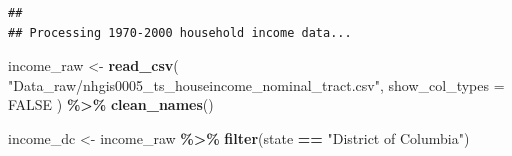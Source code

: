 \documentclass[
]{article}
\newenvironment{Shaded}{\begin{snugshade}}{\end{snugshade}}
\newcommand{\AttributeTok}[1]{\textcolor[rgb]{0.13,0.29,0.53}{#1}}
\newcommand{\ConstantTok}[1]{\textcolor[rgb]{0.56,0.35,0.01}{#1}}
\newcommand{\FunctionTok}[1]{\textcolor[rgb]{0.13,0.29,0.53}{\textbf{#1}}}
\newcommand{\NormalTok}[1]{#1}
\newcommand{\OtherTok}[1]{\textcolor[rgb]{0.56,0.35,0.01}{#1}}
\newcommand{\SpecialCharTok}[1]{\textcolor[rgb]{0.81,0.36,0.00}{\textbf{#1}}}
\newcommand{\StringTok}[1]{\textcolor[rgb]{0.31,0.60,0.02}{#1}}
\begin{document}
\begin{verbatim}
## 
## Processing 1970-2000 household income data...
\end{verbatim}

\begin{Shaded}
\begin{Highlighting}[]
\NormalTok{income\_raw }\OtherTok{\textless{}{-}} \FunctionTok{read\_csv}\NormalTok{(}
  \StringTok{"Data\_raw/nhgis0005\_ts\_houseincome\_nominal\_tract.csv"}\NormalTok{,}
  \AttributeTok{show\_col\_types =} \ConstantTok{FALSE}
\NormalTok{) }\SpecialCharTok{\%\textgreater{}\%}
  \FunctionTok{clean\_names}\NormalTok{()}

\NormalTok{income\_dc }\OtherTok{\textless{}{-}}\NormalTok{ income\_raw }\SpecialCharTok{\%\textgreater{}\%}
  \FunctionTok{filter}\NormalTok{(state }\SpecialCharTok{==} \StringTok{"District of Columbia"}\NormalTok{)}


\end{Highlighting}
\end{Shaded}
\end{document}
